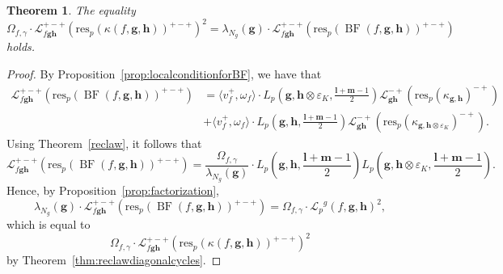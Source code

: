 \documentclass[a4paper,11pt]{amsart}
\theoremstyle{plain}
\newtheorem{theorem}{Theorem}[section]
\theoremstyle{definition}
\theoremstyle{remark}
\newtheorem{remarkwr}[theorem]{Remark}
\newenvironment{remark}{\begin{remarkwr}\begin{upshape}}{\end{upshape}\end{remarkwr}}
\newcommand{\bb}{\mathbb}
\newcommand{\cl}{\mathcal}
\DeclareMathOperator{\BF}{BF}
\newcommand{\Lp}{{\mathscr{L}_p}}
\newcommand{\hg}{{\mathbf{g}}}
\newcommand{\hh}{{\mathbf h}}
\newcommand{\res}{\mathrm{res}}
\numberwithin{equation}{section}
\begin{document}
\begin{theorem}\label{thm:main}
    The equality
    \[
    \Omega_{f,\gamma} \cdot \cl{L}_{f\hg\hh}^{+-+}(\res_p(\kappa(f,\hg,\hh))^{+-+})^2 =\lambda_{N_g}(\hg) \cdot \mathcal{L}_{f\hg\hh}^{+-+}(\res_p(\BF(f, \hg, \hh))^{+-+})
    \]
    holds.
\end{theorem}
\begin{proof}
    By Proposition~\ref{prop:localconditionforBF}, we have that
    \begin{align*}
        \mathcal{L}^{+-+}_{f\hg\hh}(\res_p(\BF(f,\hg,\hh))^{+-+})&=\langle v_f^+,\omega_f\rangle \cdot L_p\left(\hg,\hh\otimes\varepsilon_K,\frac{\mathbf{l}+\mathbf{m}-1}{2}\right)\cl{L}_{\hg\hh}^{-+}\left(\res_p(\kappa_{\hg,\hh})^{-+}\right) \\
        &+\langle v_f^+,\omega_f\rangle \cdot L_p\left(\hg,\hh,\frac{\mathbf{l}+\mathbf{m}-1}{2}\right)\cl{L}_{\hg\hh}^{-+}\left(\res_p(\kappa_{\hg,\hh\otimes\varepsilon_K})^{-+}\right).
    \end{align*}
    Using Theorem~\ref{reclaw}, it follows that
    \[
    \mathcal{L}^{+-+}_{f\hg\hh}(\res_p(\BF(f,\hg,\hh))^{+-+})=\frac{\Omega_{f,\gamma}}{\lambda_{N_g}(\hg)}\cdot L_p\left(\hg,\hh,\frac{\mathbf{l}+\mathbf{m}-1}{2}\right)L_p\left(\hg,\hh\otimes\varepsilon_K,\frac{\mathbf{l}+\mathbf{m}-1}{2}\right).
    \]
    Hence, by Proposition~\ref{prop:factorization},
    \[
    \lambda_{N_g}(\hg)\cdot \mathcal{L}^{+-+}_{f\hg\hh}(\res_p(\BF(f,\hg,\hh))^{+-+})=\Omega_{f,\gamma}\cdot \Lp^g(f,\hg,\hh)^2,
    \]
    which is equal to
    \[
    \Omega_{f,\gamma} \cdot \cl{L}^{+-+}_{f\hg\hh}(\res_p(\kappa(f,\hg,\hh))^{+-+})^2
    \]
    by Theorem~\ref{thm:reclawdiagonalcycles}.
\end{proof}

\end{document}
